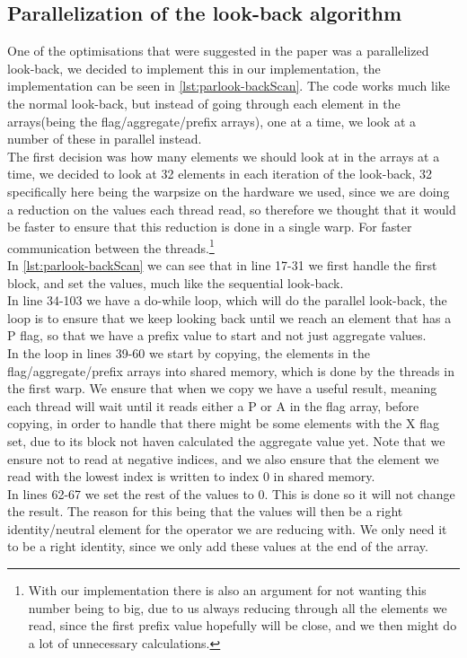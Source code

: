 \documentclass[twocolumn]{article}
\begin{document}
\subsection{Parallelization of the look-back algorithm}
One of the optimisations that were suggested in the paper was a parallelized look-back, we decided to implement this in our implementation, the implementation can be seen in \autoref{lst:parlook-backScan}. The code works much like the normal look-back, but instead of going through each element in the arrays(being the flag/aggregate/prefix arrays), one at a time, we look at a number of these in parallel instead.\\
The first decision was how many elements we should look at in the arrays at a time, we decided to look at 32 elements in each iteration of the look-back, 32 specifically here being the warpsize on the hardware we used, since we are doing a reduction on the values each thread read, so therefore we thought that it would be faster to ensure that this reduction is done in a single warp. For faster communication between the threads.\footnote{With our implementation there is also an argument for not wanting this number being to big, due to us always reducing through all the elements we read, since the first prefix value hopefully will be close, and we then might do a lot of unnecessary calculations.}\\
In \autoref{lst:parlook-backScan} we can see that in line 17-31 we first handle the first block, and set the values, much like the sequential look-back.\\
In line 34-103 we have a do-while loop, which will do the parallel look-back, the loop is to ensure that we keep looking back until we reach an element that has a P flag, so that we have a prefix value to start and not just aggregate values.\\
In the loop in lines 39-60 we start by copying, the elements in the flag/aggregate/prefix arrays into shared memory, which is done by the threads in the first warp. We ensure that when we copy we have a useful result, meaning each thread will wait until it reads either a P or A in the flag array, before copying, in order to handle that there might be some elements with the X flag set, due to its block not haven calculated the aggregate value yet.
Note that we ensure not to read at negative indices, and we also ensure that the element we read with the lowest index is written to index 0 in shared memory.\\
In lines 62-67 we set the rest of the values to 0. This is done so it will not change the result. The reason for this being that the values will then be a right identity/neutral element for the operator we are reducing with. We only need it to be a right identity, since we only add these values at the end of the array.\\
\end{document}
